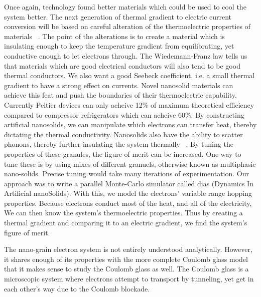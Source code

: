	Once again, technology found better materials which could be used to cool the system better. The next generation of thermal gradient to electric current conversion will be based on careful alteration of the thermoelectric properties of materials ~\cite{Sparks16}. The point of the alterations is to create a material which is insulating enough to keep the temperature gradient from equilibrating, yet conductive enough to let electrons through. The Wiedemann-Franz law tells us that materials which are good electrical conductors will also tend to be good thermal conductors. We also want a good Seebeck coefficient, i.e. a small thermal gradient to have a strong effect on currents. Novel nanosolid materials can achieve this feat and push the boundaries of their thermoelectric capability. Currently Peltier devices can only acheive 12\% of maximum theoretical efficiency compared to compressor refrigerators which can acheive 60\%. By constructing artificial nanosolids, we can manipulate which electrons can transfer heat, thereby dictating the thermal conductivity. Nanosolids also have the ability to scatter phonons, thereby further insulating the system thermally ~\cite{glatz09}. By tuning the properties of these granules, the figure of merit can be increased. One way to tune these is by using mixes of different granuels, otherwise known as multiphasic nano-solids. Precise tuning would take many iterations of experimentation. Our approach was to write a parallel Monte-Carlo simulator called {\sc dias} (Dynamics In Artificial nanoSolids). With this, we model the electrons' variable range hopping properties. Because electrons conduct most of the heat, and all of the electricity, We can then know the system's thermoelectric properties. Thus by creating a thermal gradient and comparing it to an electric gradient, we find the system's figure of merit. 

The nano-grain electron system is not entirely understood analytically. However, it shares enough of its properties with the more complete Coulomb glass model that it makes sense to study the Coulomb glass as well. The Coulomb glass is a microscopic system where electrons attempt to transport by tunneling, yet get in each other's way due to the Coulomb blockade. 

